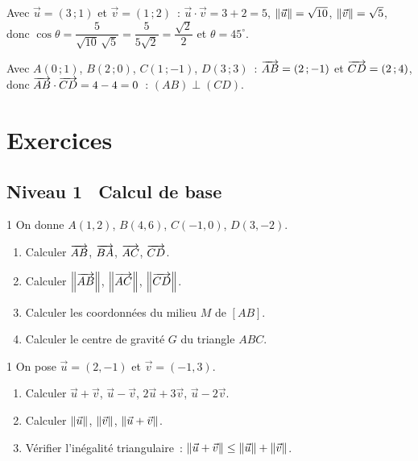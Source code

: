 \begin{ex}
Avec $\vec u=(3\,;1)$ et $\vec v=(1\,;2)$~: $\vec u\cdot\vec v=3+2=5$,
$\left\|\vec u\right\|=\sqrt{10}$, $\left\|\vec v\right\|=\sqrt5$, donc
$\cos\theta=\dfrac{5}{\sqrt{10}\,\sqrt5}=\dfrac{5}{5\sqrt2}=\dfrac{\sqrt2}{2}$ et $\theta=45^{\circ}$.

Avec $A(0\,;1)$, $B(2\,;0)$, $C(1\,;-1)$, $D(3\,;3)$~: $\overrightarrow{AB}=(2\,;-1)$ et
$\overrightarrow{CD}=(2\,;4)$, donc $\overrightarrow{AB}\cdot\overrightarrow{CD}=4-4=0$~: $(AB)\perp(CD)$.
\end{ex}

\section{Exercices}

\subsection*{\quad Niveau 1 \textemdash\ Calcul de base}

\begin{exo}{1}
On donne $A(1,2)$, $B(4,6)$, $C(-1,0)$, $D(3,-2)$.
\begin{enumerate}
  \item Calculer $\overrightarrow{AB}$, $\overrightarrow{BA}$, $\overrightarrow{AC}$, $\overrightarrow{CD}$.
  \item Calculer $\left\|\overrightarrow{AB}\right\|$, $\left\|\overrightarrow{AC}\right\|$, $\left\|\overrightarrow{CD}\right\|$.
  \item Calculer les coordonn\'ees du milieu $M$ de $[AB]$.
  \item Calculer le centre de gravit\'e $G$ du triangle $ABC$.
\end{enumerate}
\end{exo}

\begin{exo}{1}
On pose $\vec{u}=(2,-1)$ et $\vec{v}=(-1,3)$.
\begin{enumerate}
  \item Calculer $\vec{u}+\vec{v}$, $\vec{u}-\vec{v}$,
        $2\vec{u}+3\vec{v}$, $\vec{u}-2\vec{v}$.
  \item Calculer $\left\|\vec{u}\right\|$, $\left\|\vec{v}\right\|$,
        $\left\|\vec{u}+\vec{v}\right\|$.
  \item V\'erifier l'in\'egalit\'e triangulaire~:
        $\left\|\vec{u}+\vec{v}\right\| \leq \left\|\vec{u}\right\|+\left\|\vec{v}\right\|$.
\end{enumerate}
\end{exo}

